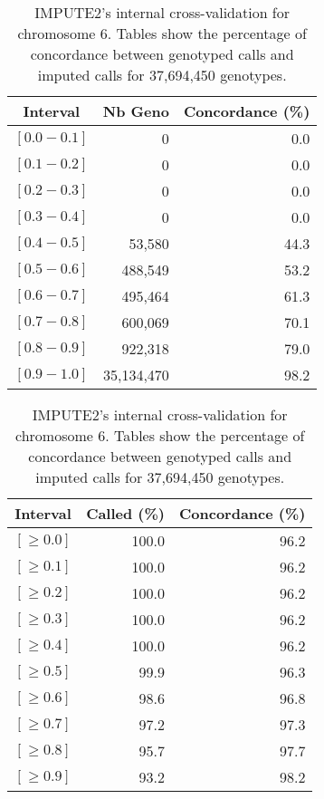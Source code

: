 \documentclass[10pt,twoside,english]{scrartcl}
\begin{document}
\begin{table}[H]
\protect\caption{IMPUTE2's internal cross-validation for chromosome 6. Tables show the
percentage of concordance between genotyped calls and imputed calls
for 37,694,450 genotypes.\label{tab:cross_validation_chr_6}}

\centering

\begin{tabular}{crr}
\hline 
\multicolumn{1}{c}{\textbf{Interval}}
 & \multicolumn{1}{c}{\textbf{Nb Geno}}
 & \multicolumn{1}{c}{\textbf{Concordance (\%)}}
\\
\hline 

$[0.0-0.1]$ & 0 & 0.0\\
$[0.1-0.2]$ & 0 & 0.0\\
$[0.2-0.3]$ & 0 & 0.0\\
$[0.3-0.4]$ & 0 & 0.0\\
$[0.4-0.5]$ & 53,580 & 44.3\\
$[0.5-0.6]$ & 488,549 & 53.2\\
$[0.6-0.7]$ & 495,464 & 61.3\\
$[0.7-0.8]$ & 600,069 & 70.1\\
$[0.8-0.9]$ & 922,318 & 79.0\\
$[0.9-1.0]$ & 35,134,470 & 98.2\\
\hline 
\end{tabular}
\hfill
\begin{tabular}{crr}
\hline 
\multicolumn{1}{c}{\textbf{Interval}}
 & \multicolumn{1}{c}{\textbf{Called (\%)}}
 & \multicolumn{1}{c}{\textbf{Concordance (\%)}}
\\
\hline 

$[\geq 0.0]$ & 100.0 & 96.2\\
$[\geq 0.1]$ & 100.0 & 96.2\\
$[\geq 0.2]$ & 100.0 & 96.2\\
$[\geq 0.3]$ & 100.0 & 96.2\\
$[\geq 0.4]$ & 100.0 & 96.2\\
$[\geq 0.5]$ & 99.9 & 96.3\\
$[\geq 0.6]$ & 98.6 & 96.8\\
$[\geq 0.7]$ & 97.2 & 97.3\\
$[\geq 0.8]$ & 95.7 & 97.7\\
$[\geq 0.9]$ & 93.2 & 98.2\\
\hline 
\end{tabular}


\end{table}
\end{document}
